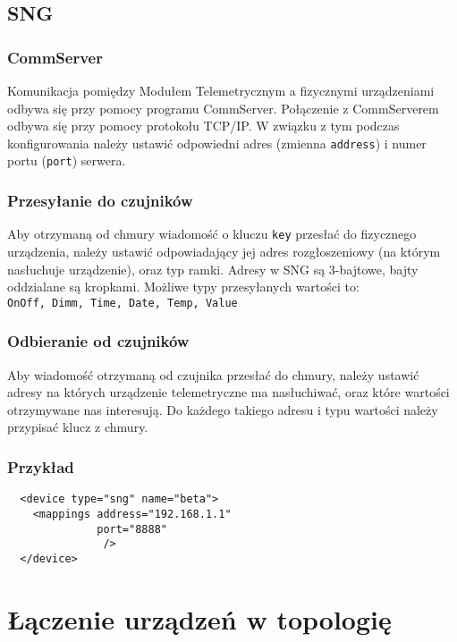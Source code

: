 \documentclass[11pt]{article}
\begin{document}
\subsection{SNG}

\subsubsection{CommServer}
Komunikacja pomiędzy Modułem Telemetrycznym a fizycznymi urządzeniami odbywa się przy pomocy
programu CommServer. Połączenie z CommServerem odbywa się przy pomocy protokołu TCP/IP.
W związku z tym podczas konfigurowania należy ustawić odpowiedni adres (zmienna \verb|address|)
i numer portu (\verb|port|) serwera.

\subsubsection{Przesyłanie do czujników}
Aby otrzymaną od chmury wiadomość o kluczu \verb|key| przesłać do fizycznego urządzenia,
należy ustawić odpowiadający jej adres rozgłoszeniowy (na którym nasłuchuje urządzenie), 
oraz typ ramki. Adresy w SNG są 3-bajtowe, bajty oddzialane są kropkami. 
Możliwe typy przesyłanych wartości to:\\
\verb|OnOff, Dimm, Time, Date, Temp, Value|

\subsubsection{Odbieranie od czujników}
Aby wiadomość otrzymaną od czujnika przesłać do chmury, należy ustawić adresy na których urządzenie telemetryczne
ma nasłuchiwać, oraz które wartości otrzymywane nas interesują. Do każdego takiego adresu i typu wartości
należy przypisać klucz z chmury.

\subsubsection{Przykład}
\begin{verbatim}
  <device type="sng" name="beta">
    <mappings address="192.168.1.1"
              port="8888"
               />
  </device>
\end{verbatim}


\section{Łączenie urządzeń w topologię}
\end{document}
